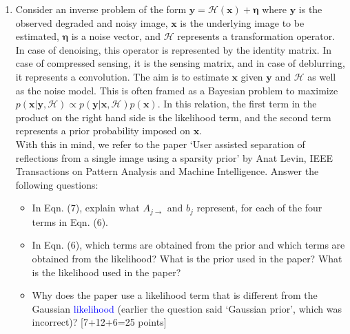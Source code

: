 \documentclass[11pt]{article}
\begin{document}
\begin{enumerate}

\item Consider an inverse problem of the form $\boldsymbol{y} = \mathcal{H}(\boldsymbol{x}) + \boldsymbol{\eta}$ where $\boldsymbol{y}$ is the observed degraded and noisy image, $\boldsymbol{x}$ is the underlying image to be estimated, $\boldsymbol{\eta}$ is a noise vector, and $\mathcal{H}$ represents a transformation operator. In case of denoising, this operator is represented by the identity matrix. In case of compressed sensing, it is the sensing matrix, and in case of deblurring, it represents a convolution. The aim is to estimate $\boldsymbol{x}$ given $\boldsymbol{y}$ and $\mathcal{H}$ as well as the noise model. This is often framed as a Bayesian problem to maximize
$p(\boldsymbol{x}|\boldsymbol{y},\mathcal{H}) \propto p(\boldsymbol{y}|\boldsymbol{x},\mathcal{H}) p(\boldsymbol{x})$. In this relation, the first term in the product on the right hand side is the likelihood term, and the second term represents a prior probability imposed on $\boldsymbol{x}$. 
\\
With this in mind, we refer to the paper `User assisted separation of reflections from a single image using a sparsity prior' by Anat Levin, IEEE Transactions on Pattern Analysis and Machine Intelligence. Answer the following questions: 
\begin{itemize}
\item In Eqn. (7), explain what $A_{j \rightarrow}$ and $b_j$ represent, for each of the four terms in Eqn. (6).
\item In Eqn. (6), which terms are obtained from the prior and which terms are obtained from the likelihood? What is the prior used in the paper? What is the likelihood used in the paper?
\item Why does the paper use a likelihood term that is different from the Gaussian \textcolor{blue}{likelihood} (earlier the question said `Gaussian prior', which was incorrect)? \textsf{[7+12+6=25 points]}
\end{itemize}


\end{enumerate}
\end{document}

